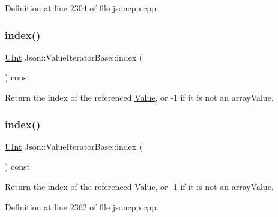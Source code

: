 Definition at line 2304 of file jsoncpp.\+cpp.

\hypertarget{class_json_1_1_value_iterator_base_a549c66a0bd20e9ae772175a5c0d2e88a}{}\label{class_json_1_1_value_iterator_base_a549c66a0bd20e9ae772175a5c0d2e88a} 
\subsubsection{\texorpdfstring{index()}{index()}\hspace{0.1cm}{\footnotesize\ttfamily [1/2]}}
{\footnotesize\ttfamily \hyperlink{namespace_json_a800fb90eb6ee8d5d62b600c06f87f7d4}{U\+Int} Json\+::\+Value\+Iterator\+Base\+::index (\begin{DoxyParamCaption}{ }\end{DoxyParamCaption}) const}



Return the index of the referenced \hyperlink{class_json_1_1_value}{Value}, or -\/1 if it is not an array\+Value. 

\hypertarget{class_json_1_1_value_iterator_base_a549c66a0bd20e9ae772175a5c0d2e88a}{}\label{class_json_1_1_value_iterator_base_a549c66a0bd20e9ae772175a5c0d2e88a} 
\subsubsection{\texorpdfstring{index()}{index()}\hspace{0.1cm}{\footnotesize\ttfamily [2/2]}}
{\footnotesize\ttfamily \hyperlink{namespace_json_a800fb90eb6ee8d5d62b600c06f87f7d4}{U\+Int} Json\+::\+Value\+Iterator\+Base\+::index (\begin{DoxyParamCaption}{ }\end{DoxyParamCaption}) const}



Return the index of the referenced \hyperlink{class_json_1_1_value}{Value}, or -\/1 if it is not an array\+Value. 



Definition at line 2362 of file jsoncpp.\+cpp.

\hypertarget{class_json_1_1_value_iterator_base_a010b5ad3f3337ae3732e5d7e16ca5e25}{}\label{class_json_1_1_value_iterator_base_a010b5ad3f3337ae3732e5d7e16ca5e25} 
